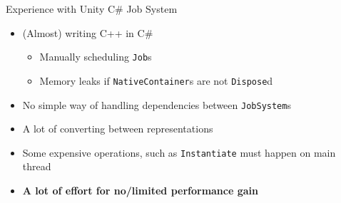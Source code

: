\begin{frame}{\secname}{\subsecname}
	Experience with Unity C\# Job System
	\begin{itemize}
		\item<2-> (Almost) writing C++ in C\#
		\begin{itemize}
			\item Manually scheduling \texttt{Job}s
			\item Memory leaks if \texttt{NativeContainer}s are not \texttt{Dispose}d
		\end{itemize}
		\item<3-> No simple way of handling dependencies between \texttt{JobSystem}s
		\item<4-> A lot of converting between representations
		\item<5-> Some expensive operations, such as \texttt{Instantiate} must happen on main thread
		\item<6-> \textbf{A lot of effort for no/limited performance gain}
	\end{itemize}
\end{frame}
